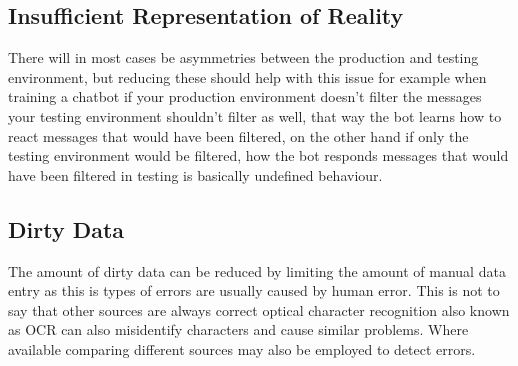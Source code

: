 


\subsection{Insufficient Representation of Reality}
There will in most cases be asymmetries between the production
and testing environment, but reducing these should help with 
this issue for example when training a chatbot if your production environment doesn't filter the messages your testing
environment shouldn't filter as well, that way the bot 
learns how to react messages that would have been filtered, on the other hand  if only the testing environment would be filtered, how the bot responds messages that would have been filtered in testing
is basically undefined behaviour.

\subsection{Dirty Data}
The amount of dirty data can be reduced by limiting 
the amount of manual data entry as this is types of errors 
are usually caused by human error. This is not to say that other sources are
always correct optical character recognition also known as OCR can 
also misidentify characters and cause similar problems.
Where available comparing different sources may also be employed to detect errors.










